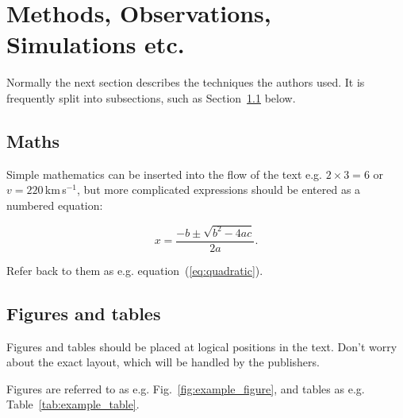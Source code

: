 \documentclass[fleqn,usenatbib]{mnras}
\begin{document}
\section{Methods, Observations, Simulations etc.}

Normally the next section describes the techniques the authors used.
It is frequently split into subsections, such as Section~\ref{sec:maths} below.

\subsection{Maths}
\label{sec:maths} %

Simple mathematics can be inserted into the flow of the text e.g. $2\times3=6$
or $v=220$\,km\,s$^{-1}$, but more complicated expressions should be entered
as a numbered equation:

\begin{equation}
    x=\frac{-b\pm\sqrt{b^2-4ac}}{2a}.
	\label{eq:quadratic}
\end{equation}

Refer back to them as e.g. equation~(\ref{eq:quadratic}).

\subsection{Figures and tables}

Figures and tables should be placed at logical positions in the text. Don't
worry about the exact layout, which will be handled by the publishers.

Figures are referred to as e.g. Fig.~\ref{fig:example_figure}, and tables as
e.g. Table~\ref{tab:example_table}.
\end{document}
